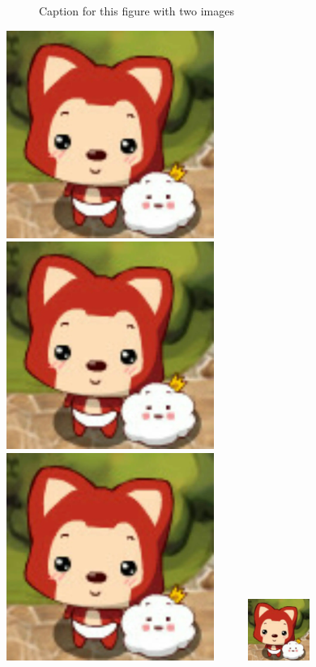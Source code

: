 \documentclass[12pt, a4paper]{article}
\begin{document}
\begin{figure}[H]
    \caption{Caption for this figure with two images}
    \label{fig:img2}
\end{figure}

\includegraphics[scale=0.1]{favicon.png}
\includegraphics[scale=0.2]{favicon.png}
\includegraphics[scale=0.3]{favicon.png}
\includegraphics[width=4cm, height=2cm]{favicon.png}
\end{document}
